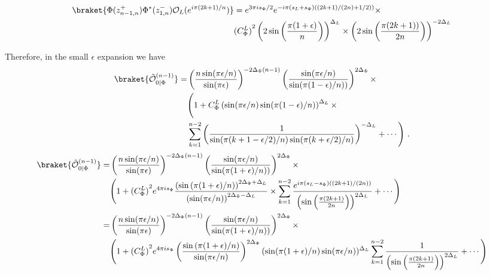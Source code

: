\documentclass[11pt]{article}
\newcommand{\ep}{\epsilon}
\newcommand{\mO}{\mathcal{O}}
\newcommand{\nn}{\nonumber}
\newcommand{\lb}{\left(}
\newcommand{\rb}{\right)}
\begin{document}
\begin{align}
\braket{\Phi(z^+_{n-1,n})\Phi^*(z^-_{1,n})\mO_L(e^{i\pi(2k+1) /n})}&=e^{3\pi i s_\Phi/2}e^{-i\pi (s_L+s_\Phi)\lb (2k+1)/(2n)+1/2)\rb} \times \nn\\
&{(C_\Phi^L)}^2\lb 2\sin\lb\frac{\pi(1+\ep)}{n}\rb\rb^{\Delta_L}\times\lb 2\sin\lb\frac{\pi(2k+ 1))}{2n}\rb\rb^{-2\Delta_L}\nn\\
\end{align}


Therefore, in the small $\ep$ expansion we have
\begin{align}
\braket{\tilde{\mO}_{0|\Phi}^{(n-1)}}=&\lb \frac{n \sin(\pi\ep/n)}{\sin(\pi\ep)}\rb^{-2\Delta_\Phi (n-1)}\lb\frac{\sin(\pi\ep/n)}{\sin(\pi(1-\ep)/n))}\rb^{2\Delta_\Phi}
\times\nn\\
&\Bigg( 1+C_\Phi^L\lb\sin(\pi\epsilon/n)\sin(\pi(1-\epsilon)/n)\rb^{\Delta_L}\times \nn \\
&\sum_{k=1}^{n-2}\lb \frac{1}{\sin(\pi (k+1-\ep/2)/n) \sin (\pi (k+\ep/2) /n)}\rb^{-\Delta_L} +\cdots\Bigg)\ .
\end{align}
\begin{align}
\braket{\tilde{\mO}_{0|\Phi}^{(n-1)}}=&\lb \frac{n \sin(\pi\ep/n)}{\sin(\pi\ep)}\rb^{-2\Delta_\Phi (n-1)}\lb\frac{\sin(\pi\ep/n)}{\sin(\pi(1+\ep)/n))}\rb^{2\Delta_\Phi}
\times\nn\\
&\Bigg( 1+{(C_\Phi^L)}^2 e^{4\pi i s_\Phi} \frac{\lb \sin \lb \pi (1+\ep)/n\rb \rb^{2\Delta_\Phi + \Delta_L}}{\lb \sin (\pi \ep / n)\rb^{2\Delta_\Phi - \Delta_L}}\times \sum_{k=1}^{n-2} \frac{e^{i \pi (s_L - s_\Phi)((2k+1)/(2n))}}{\lb \sin\lb \frac{ \pi(2k+1)}{2n}\rb\rb^{2\Delta_L } } +\cdots\Bigg) \\
=& \lb \frac{n \sin(\pi\ep/n)}{\sin(\pi\ep)}\rb^{-2\Delta_\Phi (n-1)}\lb\frac{\sin(\pi\ep/n)}{\sin(\pi(1+\ep)/n))}\rb^{2\Delta_\Phi}
\times\nn\\
&\Bigg( 1+{(C_\Phi^L)}^2 e^{4\pi i s_\Phi} \lb\frac{ \sin \lb \pi (1+\ep)/n\rb }{ \sin (\pi \ep / n)}\rb^{2\Delta_\Phi}(\sin(\pi(1+\ep)/n)\sin (\pi \ep/n))^{ \Delta_L} \sum_{k=1}^{n-2} \frac{1}{\lb \sin\lb \frac{ \pi(2k+1)}{2n}\rb\rb^{2\Delta_L} } +\cdots\Bigg)
\end{align}
\end{document}
